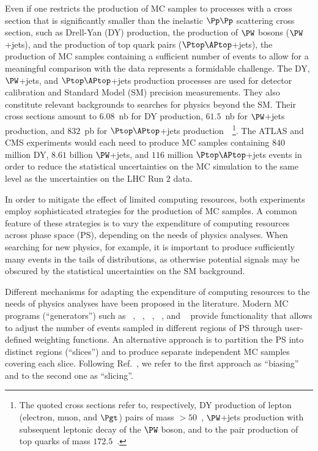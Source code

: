 Even if one restricts the production of MC samples to processes with a cross section that is significantly smaller than the inelastic $\Pp\Pp$ scattering cross section,
such as Drell-Yan (DY) production, the production of $\PW$ bosons ($\PW$+jets), and the production of top quark pairs ($\Ptop\APtop$+jets),
the production of MC samples containing a sufficient number of events to allow for a meaningful comparison with the data represents a formidable challenge.
The DY, $\PW$+jets, and $\Ptop\APtop$+jets production processes are used for detector calibration and Standard Model (SM) precision measurements.
They also constitute relevant backgrounds to searches for physics beyond the SM.
Their cross sections amount to $6.08$~nb for DY production, $61.5$~nb for $\PW$+jets production,
and $832$~pb for $\Ptop\APtop$+jets production~\cite{Melnikov:2006kv,Li:2012wna,Czakon:2011xx}~\footnote{
  The quoted cross sections refer to, respectively, DY production of lepton (electron, muon, and $\Pgt$) pairs of mass $> 50$~\GeV,
  $\PW$+jets production with subsequent leptonic decay of the $\PW$ boson,
  and to the pair production of top quarks of mass $172.5$~\GeV.
}.
The ATLAS and CMS experiments would each need to produce MC samples containing $840$ million DY, $8.61$ billion $\PW$+jets, and $116$ million $\Ptop\APtop$+jets events
in order to reduce the statistical uncertainties on the MC simulation to the same level as the uncertainties on the LHC Run $2$ data.

In order to mitigate the effect of limited computing resources, both experiments employ sophisticated strategies for the production of MC samples.
A common feature of these strategies is to vary the expenditure of computing resources across phase space (PS),
depending on the needs of physics analyses.
When searching for new physics, for example, it is important to produce sufficiently many events in the tails of distributions,
as otherwise potential signals may be obscured by the statistical uncertainties on the SM background.

Different mechanisms for adapting the expenditure of computing resources to the needs of physics analyses have been proposed in the literature.
Modern MC programs (``generators'') such as \POWHEG~\cite{POWHEG1,POWHEG2,POWHEG3}, \MGvATNLO~\cite{MGvATNLO}, \SHERPA~\cite{SHERPA}, \PYTHIA~\cite{PYTHIA}, and \HERWIG~\cite{HERWIG}
provide functionality that allows to adjust the number of events sampled in different regions of PS through user-defined weighting functions.
An alternative approach is to partition the PS into distinct regions (``slices'') and to produce separate independent MC samples covering each slice.
Following Ref.~\cite{HSFPhysicsEventGeneratorWG:2020gxw}, we refer to the first approach as ``biasing'' and to the second one as ``slicing''.

